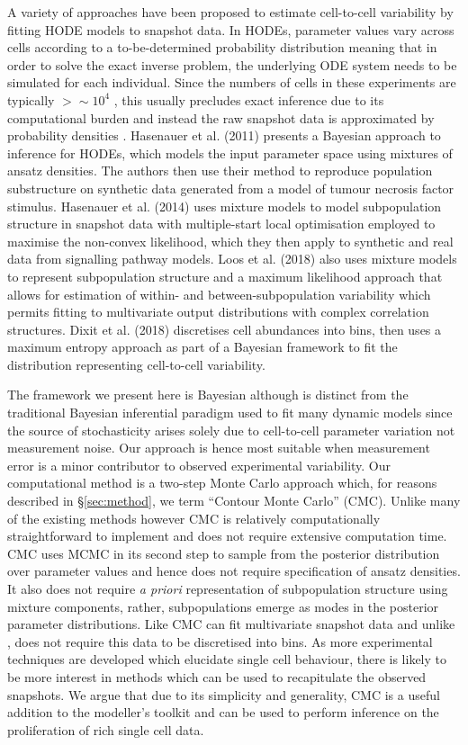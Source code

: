 A variety of approaches have been proposed to estimate cell-to-cell variability by fitting HODE models to snapshot data. In HODEs, parameter values vary across cells according to a to-be-determined probability distribution meaning that in order to solve the exact inverse problem, the underlying ODE system needs to be simulated for each individual. Since the numbers of cells in these experiments are typically $>\sim10^4$ \cite{hasenauer2011identification}, this usually precludes exact inference due to its computational burden and instead the raw snapshot data is approximated by probability densities \cite{hasenauer2011identification,hasenauer2014ode,loos2018hierarchical,dixit2018maximum}. Hasenauer et al. (2011) presents a Bayesian approach to inference for HODEs, which models the input parameter space using mixtures of ansatz densities. The authors then use their method to reproduce population substructure on synthetic data generated from a model of tumour necrosis factor stimulus. Hasenauer et al. (2014) uses mixture models to model subpopulation structure in snapshot data with multiple-start local optimisation employed to maximise the non-convex likelihood, which they then apply to synthetic and real data from signalling pathway models. Loos et al. (2018) also uses mixture models to represent subpopulation structure and a maximum likelihood approach that allows for estimation of within- and between-subpopulation variability which permits fitting to multivariate output distributions with complex correlation structures. Dixit et al. (2018) discretises cell abundances into bins, then uses a maximum entropy approach as part of a Bayesian framework to fit the distribution representing cell-to-cell variability.

The framework we present here is Bayesian although is distinct from the traditional Bayesian inferential paradigm used to fit many dynamic models since the source of stochasticity arises solely due to cell-to-cell parameter variation not measurement noise. Our approach is hence most suitable when measurement error is a minor contributor to observed experimental variability. Our computational method is a two-step Monte Carlo approach which, for reasons described in \S \ref{sec:method}, we term ``Contour Monte Carlo'' (CMC). Unlike many of the existing methods however CMC is relatively computationally straightforward to implement and does not require extensive computation time. CMC uses MCMC in its second step to sample from the posterior distribution over parameter values and hence does not require specification of ansatz densities. It also does not require \textit{a priori} representation of subpopulation structure using mixture components, rather, subpopulations emerge as modes in the posterior parameter distributions. Like \cite{loos2018hierarchical} CMC can fit multivariate snapshot data and unlike \cite{dixit2018maximum}, does not require this data to be discretised into bins. As more experimental techniques are developed which elucidate single cell behaviour, there is likely to be more interest in methods which can be used to recapitulate the observed snapshots. We argue that due to its simplicity and generality, CMC is a useful addition to the modeller's toolkit and can be used to perform inference on the proliferation of rich single cell data.


